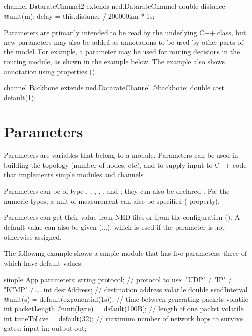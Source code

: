 \begin{ned}
channel DatarateChannel2 extends ned.DatarateChannel
{
    double distance @unit(m);
    delay = this.distance / 200000km * 1s;
}
\end{ned}

Parameters are primarily intended to be read by the underlying C++ class,
but new parameters may also be added as annotations to be used by other
parts of the model. For example, a  parameter may be used for
routing decisions in the routing module, as shown in the example below. The
example also shows annotation using properties ().

\begin{ned}
channel Backbone extends ned.DatarateChannel
{
    @backbone;
    double cost = default(1);
}
\end{ned}


\section{Parameters}
\label{sec:ned-lang:parameters}

Parameters are variables that belong to a module. Parameters can be
used in building the topology (number of nodes, etc), and to supply
input to C++ code that implements simple modules and channels.

Parameters can be of type , ,
, , , and ;
they can also be declared . For the numeric types, a unit of
measurement can also be specified ( property).

Parameters can get their value from NED files or from the configuration
(). A default value can also be given (...\ttt{)}),
which is used if the parameter is not otherwise assigned.

The following example shows a simple module that has five parameters, three
of which have default values:

\begin{ned}
simple App
{
    parameters:
        string protocol;       // protocol to use: "UDP" / "IP" / "ICMP" / ...
        int destAddress;       // destination address
        volatile double sendInterval @unit(s) = default(exponential(1s));
                               // time between generating packets
        volatile int packetLength @unit(byte) = default(100B);
                               // length of one packet
        volatile int timeToLive = default(32);
                               // maximum number of network hops to survive
    gates:
        input in;
        output out;
}
\end{ned}


